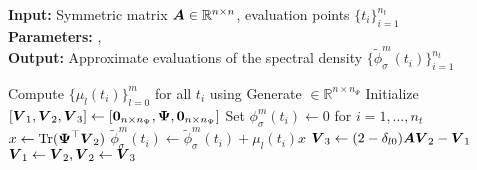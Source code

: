 \hspace*{\algorithmicindent} \textbf{Input:} Symmetric matrix $\boldsymbol{A} \in \mathbb{R}^{n \times n}$, evaluation points $\{t_i\}_{i=1}^{n_t}$ \\
\hspace*{\algorithmicindent} \textbf{Parameters:} ,  \\
\hspace*{\algorithmicindent} \textbf{Output:} Approximate evaluations of the spectral density $\{\widetilde{\phi}_{\sigma}^m(t_i)\}_{i=1}^{n_t}$
\begin{algorithmic}[1]
    \State Compute $\{\mu_l(t_i)\}_{l=0}^m$ for all $t_i$ using 
    \State Generate  $\in \mathbb{R}^{n \times n_{\Psi}}$
    \State Initialize $[\boldsymbol{V}_1, \boldsymbol{V}_2, \boldsymbol{V}_3] \gets [\boldsymbol{0}_{n \times n_{\Psi}}, \boldsymbol{\Psi}, \boldsymbol{0}_{n \times n_{\Psi}}]$
    \State Set ${\phi}_{\sigma}^m(t_i) \gets 0$ for $i=1,\dots,n_t$
      \State $x \gets \operatorname{Tr}(\boldsymbol{\Psi}^{\top} \boldsymbol{V}_2)$
        \State $\widetilde{\phi}_{\sigma}^m(t_i) \gets \widetilde{\phi}_{\sigma}^m(t_i) + \mu_l(t_i) x$
      \EndFor
      \State $\boldsymbol{V}_3 \gets (2 - \delta_{l0}) \boldsymbol{A} \boldsymbol{V}_2 - \boldsymbol{V}_1$ 
      \State $\boldsymbol{V}_1 \gets \boldsymbol{V}_2, \boldsymbol{V}_2 \gets \boldsymbol{V}_3$
    \EndFor
\end{algorithmic}
